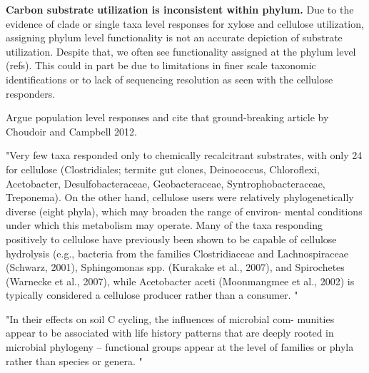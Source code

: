 \textbf{Carbon substrate utilization is inconsistent within phylum.} Due to the evidence of clade or single taxa level responses for xylose and cellulose utilization, assigning phylum level functionality is not an accurate depiction of substrate utilization. Despite that, we often see functionality assigned at the phylum level (refs). This could in part be due to limitations in finer scale taxonomic identifications or to lack of sequencing resolution as seen with the cellulose responders. 

Argue population level responses and cite that ground-breaking article by Choudoir and Campbell 2012.  
   
   "Very few taxa responded only to chemically recalcitrant substrates, with only 24 for cellulose (Clostridiales; termite gut clones, Deinococcus, Chloroflexi, Acetobacter, Desulfobacteraceae, Geobacteraceae, Syntrophobacteraceae, Treponema). On the other hand, cellulose users were relatively phylogenetically diverse (eight phyla), which may broaden the range of environ- mental conditions under which this metabolism may operate. Many of the taxa responding positively to cellulose have previously been shown to be capable of cellulose hydrolysis (e.g., bacteria from the families Clostridiaceae and Lachnospiraceae (Schwarz, 2001), Sphingomonas spp. (Kurakake et al., 2007), and Spirochetes (Warnecke et al., 2007), while Acetobacter aceti (Moonmangmee et al., 2002) is typically considered a cellulose producer rather than a consumer. "\cite{Goldfarb_2011}

"In their effects on soil C cycling, the influences of microbial com- munities appear to be associated with life history patterns that are deeply rooted in microbial phylogeny – functional groups appear at the level of families or phyla rather than species or genera. "\cite{Schimel_2012}
 

